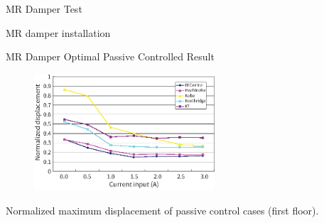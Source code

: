 \documentclass[usepdftitle=false]{beamer}
\begin{document}
\begin{frame}{MR Damper Test}
\begin{figure}[ht]
\centering
{}
\end{figure}
MR damper installation
\end{frame}




\begin{frame}{MR Damper Optimal Passive Controlled Result}
\begin{figure}[!ht]
\centering
\includegraphics[width=0.6\textwidth] {figure/n3-12.eps}

\label{fig:n3-12}
\end{figure}
Normalized maximum displacement of passive control cases (first floor).
\end{frame}
\end{document}
